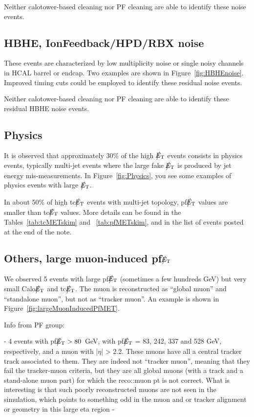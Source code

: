Neither calotower-based cleaning nor PF cleaning are able to identify these noise events.

\subsection{HBHE, IonFeedback/HPD/RBX noise}
These events are characterized by low multiplicity noise or single noisy channels in HCAL barrel or endcap.
Two examples are shown in Figure~\ref{fig:HBHEnoise}.
Improved timing cuts could be employed to identify these residual noise events.

Neither calotower-based cleaning nor PF cleaning are able to identify these residual HBHE noise events.

\subsection{Physics}
It is observed that approximately 30\% of the high $\big\slash\hspace{-1.6ex}{E_\text{T}}$ events consists in physics events, 
typically multi-jet events where the large fake $\big\slash\hspace{-1.6ex}{E_\text{T}}$ is produced by jet energy mis-measurements.
In Figure~\ref{fig:Physics}, you see some examples of physics events with large $\big\slash\hspace{-1.6ex}{E_\text{T}}$. 

In about 50\% of high tc$\big\slash\hspace{-1.6ex}{E_\text{T}}$ events with multi-jet topology, pf$\big\slash\hspace{-1.6ex}{E_\text{T}}$ values are 
smaller than tc$\big\slash\hspace{-1.6ex}{E_\text{T}}$ values. More details can be found in 
the Tables~\ref{tab:tcMETskim} and ~\ref{tab:pfMETskim}, and in the list of events posted at the end of the note.

\subsection{Others, large muon-induced pf$\big\slash\hspace{-1.6ex}{E_\text{T}}$}
We observed 5 events with large pf$\big\slash\hspace{-1.6ex}{E_\text{T}}$ (sometimes a few hundreds GeV) 
but very small Calo$\big\slash\hspace{-1.6ex}{E_\text{T}}$ and tc$\big\slash\hspace{-1.6ex}{E_\text{T}}$. 
The muon is reconstructed as ``global muon'' and ``standalone muon'', 
but not as ``tracker muon''. An example is shown in Figure~\ref{fig:largeMuonInducedPfMET}.

Info from PF group:

- 4 events with pf$\big\slash\hspace{-1.6ex}{E_\text{T}}>80$~GeV, with pf$\big\slash\hspace{-1.6ex}{E_\text{T}}$ = 83, 242, 337
and 528 GeV, respectively, and a muon with |$\eta$| > 2.2. 
These muons have all a central tracker track associated to them. They are
indeed not ``tracker muon'', meaning that they fail the tracker-muon
criteria, but they are all global muons (with a track and a stand-alone
muon part) for which the reco::muon pt is not correct. 
What is interesting is that such poorly reconstructed muons are not seen
in the simulation, which points to something odd in the muon and or
tracker alignment or geometry in this large eta region -

